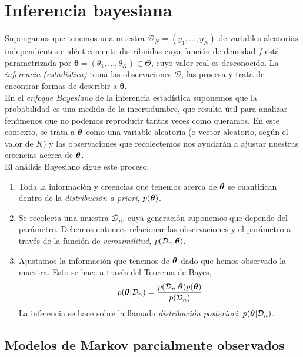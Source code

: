\section{Inferencia bayesiana}

Supongamos que tenemos una muestra $\mathcal D_N = \left(y_1,...,y_N\right)$ de variables aleatorias independientes e idénticamente distribuidas 
cuya función de densidad $f$ está parametrizada por $\boldsymbol{\theta} = (\theta_1,...,\theta_K) \in \Theta$, cuyo valor real es desconocido. 
La \textit{inferencia (estadística)} toma las observaciones $\mathcal D$, las procesa y trata de encontrar formas de describir a $\boldsymbol{\theta}$. \\

En el \textit{enfoque Bayesiano} de la inferencia estadística suponemos que la probabilidad es una medida de la incertidumbre, que resulta útil para analizar fenómenos que no podemos reproducir tantas veces como queramos. En este contexto, se trata a $\boldsymbol{\theta}$ como una variable aleatoria (o vector aleatorio, según el valor de $K$) y las observaciones que recolectemos nos ayudarán a ajustar nuestras creencias acerca de $\boldsymbol{\theta}$.\\

El análisis Bayesiano sigue este proceso: 

\begin{enumerate}
    \item Toda la información y creencias que tenemos acerca de $\boldsymbol{\theta}$ se cuantifican dentro de la \textit{distribución a priori}, $p(\boldsymbol{\theta})$.
    \item Se recolecta una muestra $\mathcal D_n$, cuya generación suponemos que depende del parámetro. Debemos entonces relacionar las observaciones y el parámetro a través de la función de \textit{verosimilitud}, $p(\mathcal D_n|\boldsymbol{\theta})$.
    \item Ajustamos la información que tenemos de $\boldsymbol{\theta}$ dado que hemos observado la muestra. Esto se hace a través del Teorema de Bayes,
    $$p(\boldsymbol{\theta}|\mathcal D_n) = \frac{p(\mathcal D_n|\boldsymbol{\theta})p(\boldsymbol{\theta})}{p(\mathcal D_n)}$$
    La inferencia se hace sobre la llamada \textit{distribución posteriori}, $p(\boldsymbol{\theta}|\mathcal D_n)$.
\end{enumerate}

\subsection{Modelos de Markov parcialmente observados}



